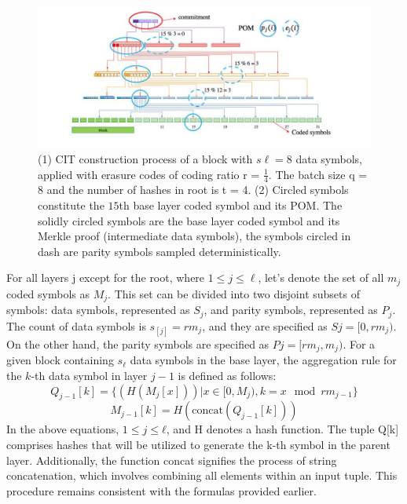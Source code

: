 \documentclass{report}
\begin{document}
\begin{center}
	\begin{figure}
		\centering
		\includegraphics[width=0.8\linewidth]{Fig/F2}
		\caption{(1) CIT construction process of a block with $s\ell = 8$ data symbols, applied with erasure codes of coding ratio r = $\frac{1}{4}$. The batch size q = 8 and the number of hashes in root is t = 4. (2) Circled symbols constitute the $15$th base layer coded symbol and its POM. The solidly circled symbols are the base layer coded symbol and its Merkle proof (intermediate data symbols), the symbols circled in dash are parity symbols sampled deterministically.
		}
		\label{fig:f1}
	\end{figure}
\end{center}
For all layers j except for the root, where $1 \leq j \leq \ell$, let's denote the set of all $m_{j}$ coded symbols as $M_{j}$. This set can be divided into two disjoint subsets of symbols: data symbols, represented as $S_{j}$, and parity symbols, represented as $P_{j}$. The count of data symbols is $s_[j] = rm_{j}$, and they are specified as $Sj = [0, rm_{j})$. On the other hand, the parity symbols are specified as $Pj = [rm_{j}, m_{j})$. For a given block containing $s_{ℓ}$ data symbols in the base layer, the aggregation rule for the $k$-th data symbol in layer $j - 1$ is defined as follows:
\begin{equation} 
	Q_{j-1}[k] = \{(H(M_{j}[x])) | x \in [0, M_{j}), k = x \mod rm_{j - 1}\}
\end{equation}
\begin{equation} 
	M_{j-1}[k] = H(\text{concat}(Q_{j-1}[k])) 
\end{equation}
In the above equations, $1 ≤ j ≤ ℓ$, and H denotes a hash function. The tuple Q[k] comprises hashes that will be utilized to generate the k-th symbol in the parent layer. Additionally, the function concat signifies the process of string concatenation, which involves combining all elements within an input tuple. This procedure remains consistent with the formulas provided earlier.\\
\end{document}
